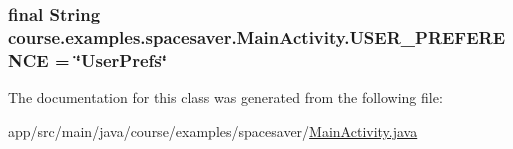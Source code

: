 \subsubsection[{U\+S\+E\+R\+\_\+\+P\+R\+E\+F\+E\+R\+E\+N\+C\+E}]{\setlength{\rightskip}{0pt plus 5cm}final String course.\+examples.\+spacesaver.\+Main\+Activity.\+U\+S\+E\+R\+\_\+\+P\+R\+E\+F\+E\+R\+E\+N\+C\+E = \char`\"{}User\+Prefs\char`\"{}\hspace{0.3cm}{\ttfamily [static]}}\label{classcourse_1_1examples_1_1spacesaver_1_1_main_activity_a62fba147272fa9f0399c82fdd08dbc82}


The documentation for this class was generated from the following file\+:\begin{DoxyCompactItemize}
\item 
app/src/main/java/course/examples/spacesaver/\hyperlink{_main_activity_8java}{Main\+Activity.\+java}\end{DoxyCompactItemize}
